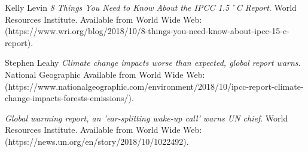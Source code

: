 \documentclass[6pt, spanish]{report}
\begin{document}
\begin{thebibliography}{9}
 Kelly Levin \emph{8 Things You Need to Know About the IPCC 1.5˚C Report}. World Resources Institute. Available from World Wide Web: (https://www.wri.org/blog/2018/10/8-things-you-need-know-about-ipcc-15-c-report).

 Stephen Leahy \emph{Climate change impacts worse than expected, global report warns}. National Geographic Available from World Wide Web: (https://www.nationalgeographic.com/environment/2018/10/ipcc-report-climate-change-impacts-forests-emissions/).


 \emph{Global warming report, an 'ear-splitting wake-up call' warns UN chief}. World Resources Institute. Available from World Wide Web: (https://news.un.org/en/story/2018/10/1022492).


\end{thebibliography}
\end{document}
